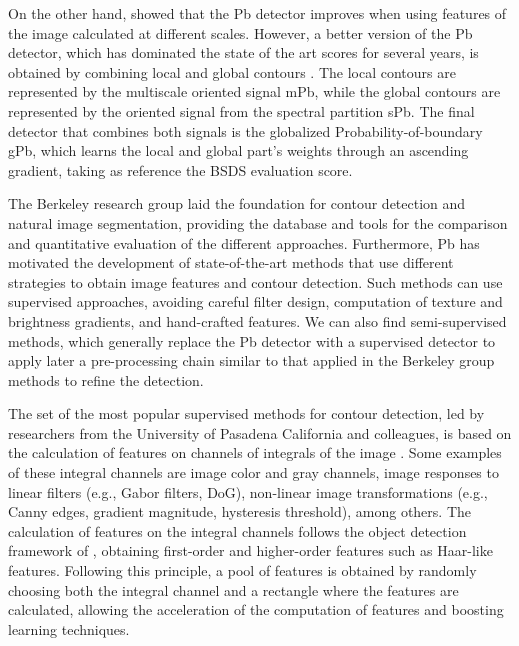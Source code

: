 On the other hand, \cite{Ren:ECCV:2008} showed that the Pb detector improves when using features of the image calculated at different scales. However, a better version of the Pb detector, which has dominated the state of the art scores for several years, is obtained by combining local and global contours \citep{Maire.Arbelaez.ea:CVPR:2008}. The local contours are represented by the multiscale oriented signal mPb, while the global contours are represented by the oriented signal from the spectral partition sPb. The final detector that combines both signals is the globalized Probability-of-boundary gPb, which learns the local and global part's weights through an ascending gradient, taking as reference the BSDS evaluation score.


The Berkeley research group laid the foundation for contour detection and natural image segmentation, providing the database and tools for the comparison and quantitative evaluation of the different approaches. Furthermore, Pb has motivated the development of state-of-the-art methods that use different strategies to obtain image features and contour detection. Such methods can use supervised approaches, avoiding careful filter design, computation of texture and brightness gradients, and hand-crafted features. We can also find semi-supervised methods, which generally replace the Pb detector with a supervised detector to apply later a pre-processing chain similar to that applied in the Berkeley group methods to refine the detection.

The set of the most popular supervised methods for contour detection, led by researchers from the University of Pasadena California and colleagues, is based on the calculation of features on channels of integrals of the image \citep{Dollar.Tu.ea:BMVC:2009}. Some examples of these integral channels are image color and gray channels, image responses to linear filters (e.g., Gabor filters, DoG), non-linear image transformations (e.g., Canny edges, gradient magnitude, hysteresis threshold), among others. The calculation of features on the integral channels follows the object detection framework of \cite{Viola.Jones:IJCV:2004}, obtaining first-order and higher-order features such as Haar-like features. Following this principle, a pool of features is obtained by randomly choosing both the integral channel and a rectangle where the features are calculated, allowing the acceleration of the computation of features and boosting learning techniques. 

